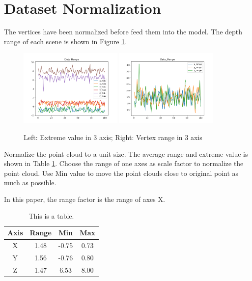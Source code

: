 \section{Dataset Normalization}

The vertices have been normalized before feed them into the model. The depth range of each scene is shown in Figure \ref{fig:data_range}.

\begin{figure}
	\centering
	{\includegraphics[width=0.45\textwidth]{./pic/Data_Extreme.png}}
	{\includegraphics[width=0.45\textwidth]{./pic/Data_Range.png}}
	\label{fig:data_range}
	\caption{Left: Extreme value in 3 axis; Right: Vertex range in 3 axis}
\end{figure}

Normalize the point cloud to a unit size. The average range and extreme value is shown in Table \ref{tab:data_range}. Choose the range of one axes as scale factor to normalize the point cloud. Use Min value to move the point clouds close to original point as much as possible. 

In this paper, the range factor is the range of axes X.

\begin{table}[!h]
	\centering
	\begin{tabular}{|c|c|c|c|}
		\hline
		Axis & Range & Min & Max\\
		\hline
		X & 1.48 & -0.75 & 0.73\\
		Y & 1.56 & -0.76 & 0.80\\
		Z & 1.47 & 6.53 & 8.00\\
		\hline
	\end{tabular}
	\caption{This is a table.}
	\label{tab:data_range}
\end{table}